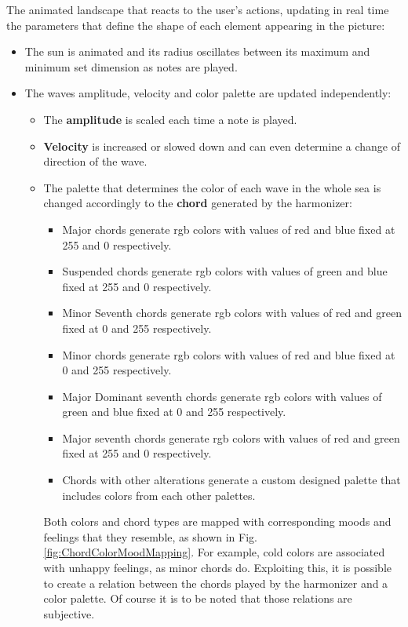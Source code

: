 \documentclass{article}
\begin{document}
The animated landscape that reacts to the user’s actions, updating in real time the parameters that define the shape of each element appearing in the picture:

\begin{itemize}
    \item The sun is animated and its radius oscillates between its maximum and minimum set dimension as notes are played.
    \item The waves amplitude, velocity and color palette are updated independently:
    \begin{itemize}
        \item The \textbf{amplitude} is scaled each time a note is played. 
        \item \textbf{Velocity} is increased or slowed down and can even determine a  change of direction of the wave.
        \item The palette that determines the color of each wave in the whole sea is changed accordingly to the \textbf{chord} generated by the harmonizer:
        \begin{itemize}
            \item Major chords generate rgb colors with values of red and blue fixed at 255 and 0 respectively.
            \item Suspended chords generate rgb colors with values of green and blue fixed at 255 and 0 respectively.
            \item Minor Seventh chords generate rgb colors with values of red and green fixed at 0 and 255 respectively.
            \item Minor chords generate rgb colors with values of red and blue fixed at 0 and 255 respectively.
            \item Major Dominant seventh chords generate rgb colors with values of green and blue fixed at 0 and 255 respectively.
            \item Major seventh chords generate rgb colors with values of red and green fixed at 255 and 0 respectively.
            \item Chords with other alterations generate a custom designed palette that includes colors from each other palettes.
        \end{itemize}
        Both colors and chord types are mapped with corresponding moods and feelings that they resemble, as shown in Fig. \ref{fig:ChordColorMoodMapping}. For example, cold colors are associated with unhappy feelings, as minor chords do. Exploiting this, it is possible to create a relation between the chords played by the harmonizer and a color palette. Of course it is to be noted that those relations are subjective.
    \end{itemize}
\end{itemize}
\end{document}
